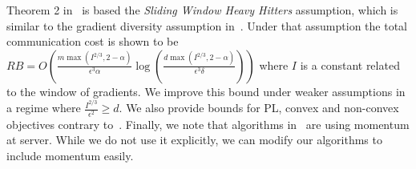 \documentclass{article}
\begin{document}
Theorem 2 in~\citet{rothchild2020fetchsgd} is based the \emph{Sliding Window Heavy Hitters} assumption, which is similar to the gradient diversity assumption in~\citet{li2018federated,haddadpour2019convergence}. 
Under that assumption the total communication cost is shown to be $RB=O\left(\frac{m\max(I^{2/3},2-\alpha)}{\epsilon^3\alpha}\log\left(\frac{d\max(I^{2/3},2-\alpha)}{\epsilon^3\delta}\right)\right)$ where $I$ is a constant related to the window of gradients.
We improve this bound under weaker assumptions in a regime where $\frac{I^{2/3}}{\epsilon^2}\geq d$. 
We also provide bounds for PL, convex and non-convex objectives contrary to~\citet{rothchild2020fetchsgd}. 
Finally, we note that algorithms in~\citet{rothchild2020fetchsgd} are using momentum at server. 
While we do not use it explicitly,  we can modify our algorithms to include momentum easily.




 


\end{document}
